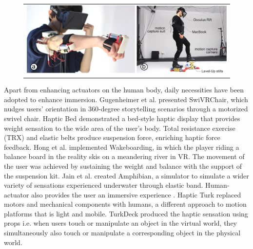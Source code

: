 \begin{figure}[h]
    \begin{center}
        \begin{tabular}{@{\hspace{0.1cm}}c}
           \includegraphics[width=1\textwidth]{figures/Force_RelatedWork.pdf}
        \end{tabular}
        \label{fig:Force_RelatedWork}
    \end{center}
\end{figure}

Apart from enhancing actuators on the human body, daily necessities have been adopted to enhance immersion. Gugenheimer et al. \cite{SwiVRChair} presented  SwiVRChair, which nudges users' orientation in 360-degree storytelling scenarios through a motorized swivel chair. Haptic Bed \cite{HapticBed} demonstrated a bed-style haptic display that provides weight sensation to the wide area of the user's body. Total resistance exercise (TRX) and elastic belts produce suspension force, enriching haptic force feedback. Hong et al. \cite{Wakeboarding} implemented Wakeboarding, in which the player riding a balance board in the reality skis on a meandering river in VR. The movement of the user was achieved by sustaining the weight and balance with the support of the suspension kit. Jain et al. \cite{Amphibian} created Amphibian, a simulator to simulate a wider variety of sensations experienced underwater through elastic band. Human-actuator also provides the user an immersive experience \cite{HapticTurk, TurkDeck}. Haptic Turk replaced motors and mechanical components with humans, a different approach to motion platforms that is light and mobile. TurkDeck produced the haptic sensation using props i.e. when users touch or manipulate an object in the virtual world, they simultaneously also touch or manipulate a corresponding object in the physical world. 


